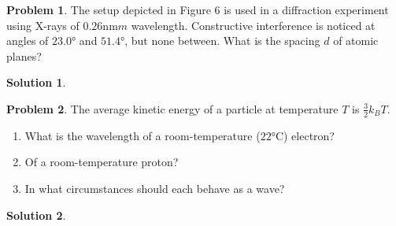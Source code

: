 \documentclass[10pt]{article}
\theoremstyle{definition}
\newtheorem{problem}{Problem}
\newtheorem{soln}{Solution}
\begin{document}
\begin{problem}
The setup depicted in Figure 6 is used in a diffraction experiment using X-rays of $0.26\unit{\nano\meter}m$ wavelength. Constructive interference is noticed
at angles of $23.0\unit{\degree}$ and $51.4\unit{\degree}$, but none between. What is the spacing $d$ of atomic planes?
\end{problem}
\begin{soln}
\end{soln}

\begin{problem}
The average kinetic energy of a particle at temperature $T$ is $\frac{3}{2}k_BT$.
\begin{enumerate}[label=(\alph*)]
  \item What is the wavelength of a room-temperature ($22\unit{\degreeCelsius}$) electron?
  \item Of a room-temperature proton?
  \item In what circumstances should each behave as a wave?
\end{enumerate}
\end{problem}
\begin{soln}
\end{soln}
\end{document}
